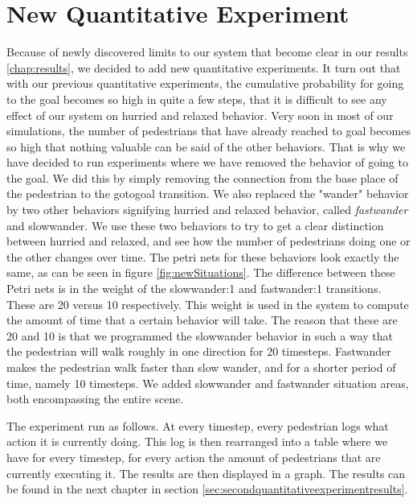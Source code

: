 \documentclass[11pt, a4paper]{book}
\begin{document}
\section{New Quantitative Experiment}
\label{sec:quantitativeexp2}
Because of newly discovered limits to our system that become clear in our results \ref{chap:results}, we decided to add new quantitative experiments. It turn out that with our previous quantitative experiments, the cumulative probability for going to the goal becomes so high in quite a few steps, that it is difficult to see any effect of our system on hurried and relaxed behavior. Very soon in most of our simulations, the number of pedestrians that have already reached to goal becomes so high that nothing valuable can be said of the other behaviors. That is why we have decided to run experiments where we have removed the behavior of going to the goal. We did this by simply removing the connection from the base place of the pedestrian to the gotogoal transition.
We also replaced the "wander" behavior by two other behaviors signifying hurried and relaxed behavior, called \emph{fastwander} and {slowwander}. We use these two behaviors to try to get a clear distinction between hurried and relaxed, and see how the number of pedestrians doing one or the other changes over time. The petri nets for these behaviors look exactly the same, as can be seen in figure \ref{fig:newSituations}. The difference between these Petri nets is in the weight of the slowwander:1 and fastwander:1 transitions. These are 20 versus 10 respectively. This weight is used in the system to compute the amount of time that a certain behavior will take. The reason that these are 20 and 10 is that we programmed the slowwander behavior in such a way that the pedestrian will walk roughly in one direction for 20 timesteps. Fastwander makes the pedestrian walk faster than slow wander, and for a shorter period of time, namely 10 timesteps. We added slowwander and fastwander situation areas, both encompassing the entire scene.

The experiment run as follows. At every timestep, every pedestrian logs what action it is currently doing. This log is then rearranged into a table where we have for every timestep, for every action the amount of pedestrians that are currently executing it. The results are then displayed in a graph. The results can be found in the next chapter in section \ref{sec:secondquantitativeexperimentresults}.
\end{document}
